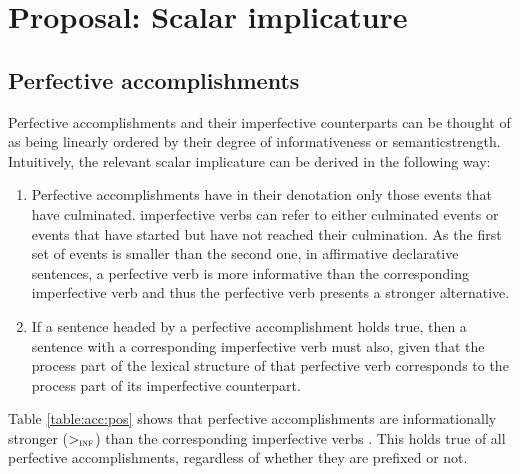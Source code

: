 \section{Proposal: Scalar implicature}\label{sec:pragm:new}
\subsection{Perfective accomplishments}\label{sec:pragm:new:perf}
Perfective accomplishments and their imperfective counterparts can be thought of as being linearly ordered by their degree of informativeness or semantic\linebreak strength.
Intuitively, the relevant scalar implicature can be derived in the following way:

\begin{enumerate}
\item
Perfective accomplishments have in their denotation only those events that have culminated. imperfective verbs  can refer to either culminated events or events that have started but have not reached their culmination. As the first set of events is smaller than the second one, in affirmative declarative sentences, a perfective verb  is more informative than the corresponding imperfective verb  and thus the perfective verb  presents a stronger alternative.
\item If a sentence headed by a perfective accomplishment holds true, then a sentence with a corresponding imperfective verb  must also, given that the process part of the lexical structure of that perfective verb  corresponds to the process part of its imperfective counterpart.
\end{enumerate}
Table \ref{table:acc:pos} shows that perfective accomplishments are informationally stronger ($>_{\textsc{inf}}$) than the corresponding imperfective verbs . This holds true of all perfective accomplishments, regardless of whether they are prefixed or not.

